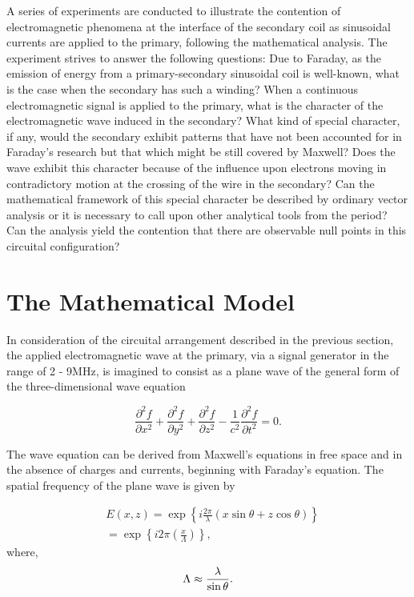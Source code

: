 \documentclass[]{article}
\begin{document}
A series of experiments are conducted to illustrate the contention of electromagnetic phenomena at the interface of the secondary coil as sinusoidal currents are applied to the primary, following the mathematical analysis. The experiment strives to answer the following questions: Due to Faraday, as the emission of energy from a primary-secondary sinusoidal coil is well-known, what is the case when the secondary has such a winding? When a continuous electromagnetic signal is applied to the primary, what is the character of the electromagnetic wave induced in the secondary? What kind of special character, if any, would the secondary exhibit patterns that have not been accounted for in Faraday’s research but that which might be still covered by Maxwell? Does the wave exhibit this character because of the influence upon electrons moving in contradictory motion at the crossing of the wire in the secondary? Can the mathematical framework of this special character be described by ordinary vector analysis or it is necessary to call upon other analytical tools from the period? Can the  analysis yield the contention that there are observable null points in this circuital configuration?


\section{The Mathematical Model}
In consideration of the circuital arrangement described in the previous section, the applied electromagnetic wave at the primary, via a signal generator in the range of 2 - 9MHz, is imagined to consist as a plane wave of the general form of the three-dimensional wave equation

\begin{equation}
\frac{{{\partial }^{2}}f}{\partial {{x}^{2}}}+\frac{{{\partial }^{2}}f}{\partial {{y}^{2}}}+\frac{{{\partial }^{2}}f}{\partial {{z}^{2}}}-\frac{1}{{{c}^{2}}}\frac{{{\partial }^{2}}f}{\partial {{t}^{2}}}=0.\label{eq:one}
\end{equation}

The wave equation can be derived from Maxwell’s equations in free space and in the absence of charges and currents, beginning with Faraday’s equation. The spatial frequency of the plane wave is given by

\begin{equation}
\begin{align}
  & E\left( x,z \right)=\exp \left\{ i\frac{2\pi }{\lambda }\left( x\sin \theta +z\cos \theta  \right) \right\} \\ 
 & =\exp \left\{ i2\pi \left( \frac{x}{\Lambda } \right) \right\},\end{align}\label{eq:two}
\end{equation}
where,
\begin{equation}
 \\\Lambda \approx \frac{\lambda }{\sin \theta }.\label{eq:three}
\end{equation}
\end{document}
